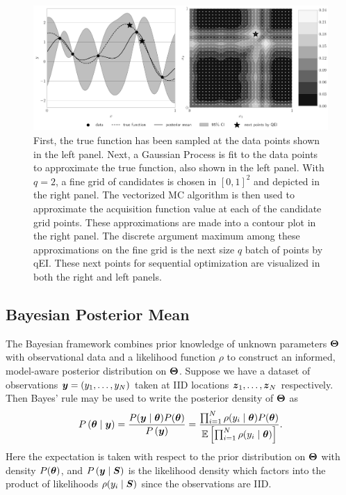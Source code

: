 \documentclass{article}[12pt]
\begin{document}
\begin{figure}[t]
    \centering
    \includegraphics[width=\textwidth]{figs/gp.pdf}
    \caption{First, the true function has been sampled at the data points shown in the left panel. Next, a Gaussian Process is fit to the data points to approximate the true function, also shown in the left panel. With $q=2$, a fine grid of candidates is chosen in $[0,1]^{2}$ and depicted in the right panel. The vectorized MC algorithm is then used to approximate the acquisition function value at each of the candidate grid points. These approximations are made into a contour plot in the right panel. The discrete argument maximum among these approximations on the fine grid is the next size $q$ batch of points by qEI. These next points for sequential optimization are visualized in both the right and left panels. }
    \label{fig:bo_qei}
\end{figure}

\subsection{Bayesian Posterior Mean}

The Bayesian framework combines prior knowledge of unknown parameters $\boldsymbol{\Theta}$ with observational data and a likelihood function $\rho$ to construct an informed, model-aware posterior distribution on $\boldsymbol{\Theta}$. Suppose we have a dataset of observations $\boldsymbol{y} = (y_1,\dots,y_{N})$ taken at IID locations $\boldsymbol{z}_1,\dots,\boldsymbol{z}_{N}$ respectively. Then Bayes' rule may be used to write the posterior density of $\boldsymbol{\Theta}$ as 
$$P\left(\boldsymbol{\theta} \mid \boldsymbol{y} \right) = \frac{P(\boldsymbol{y} \mid \boldsymbol{\theta}) P(\boldsymbol{\theta})}{P\left(\boldsymbol{y}\right)} = \frac{\prod_{i=1}^{N} \rho(y_i \mid \boldsymbol{\theta}) P(\boldsymbol{\theta})}{\mathbb{E}\left[\prod_{i=1}^{N} \rho(y_i \mid \boldsymbol{\theta})\right]}.$$
Here the expectation is taken with respect to the prior distribution on $\boldsymbol{\Theta}$ with density $P(\boldsymbol{\theta})$, and $P\left(\boldsymbol{y} \mid \boldsymbol{S} \right)$ is the likelihood density which factors into the product of likelihoods $\rho(y_i \mid \boldsymbol{S})$ since the observations are IID. 
\end{document}
